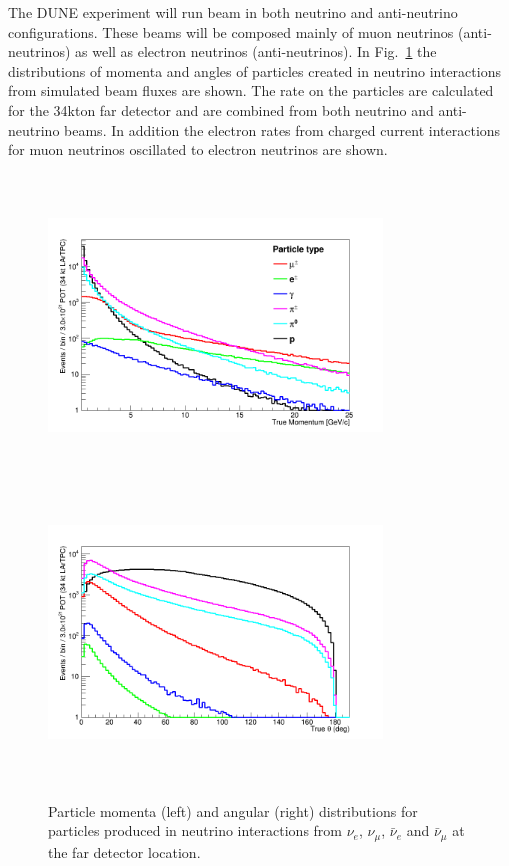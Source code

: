 The DUNE experiment will run beam in both neutrino and anti-neutrino 
configurations. These beams will be composed  mainly of muon neutrinos (anti-neutrinos) as well as electron neutrinos (anti-neutrinos). In Fig.~\ref{fig:particle_momenta} the distributions of momenta and angles of particles created in neutrino interactions from simulated beam fluxes are shown. The rate on the particles are calculated for the 34kton far detector and  are combined from both neutrino and anti-neutrino beams. In addition the electron rates from charged current interactions for muon neutrinos oscillated to electron neutrinos are shown. 
\begin{figure}[h!]
  \centering
\includegraphics[width=0.79\textwidth,height=8.0cm]{figures/True_Momenta_per_Particle_9_2_1_0_log} \\
\includegraphics[width=0.79\textwidth,height=8.0cm]{figures/True_theta_per_Particle_9_2_1_0_lin}
  \caption{Particle momenta (left) and angular (right) distributions for particles produced in neutrino interactions 
from $\nu_e$, $\nu_\mu$, $\bar \nu_e$ and $\bar \nu_\mu$ at the far detector location.
}
\label{fig:particle_momenta}
\end{figure}



